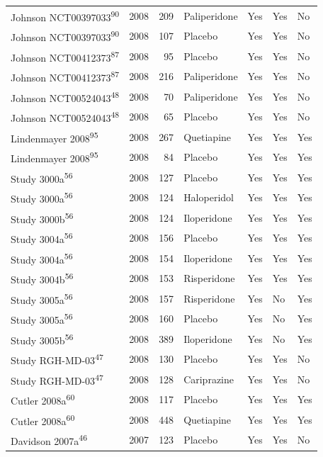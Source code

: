\documentclass[
  9pt,
  english,
  ,jou,floatsintext]{apa6}
\begin{document}
\begin{longtable}[]{@{}lrrllll@{}}
Johnson NCT00397033\textsuperscript{90} & 2008 & 209 & Paliperidone & Yes & Yes & No \\
Johnson NCT00397033\textsuperscript{90} & 2008 & 107 & Placebo & Yes & Yes & No \\
Johnson NCT00412373\textsuperscript{87} & 2008 & 95 & Placebo & Yes & Yes & No \\
Johnson NCT00412373\textsuperscript{87} & 2008 & 216 & Paliperidone & Yes & Yes & No \\
Johnson NCT00524043\textsuperscript{48} & 2008 & 70 & Paliperidone & Yes & Yes & No \\
Johnson NCT00524043\textsuperscript{48} & 2008 & 65 & Placebo & Yes & Yes & No \\
Lindenmayer 2008\textsuperscript{95} & 2008 & 267 & Quetiapine & Yes & Yes & Yes \\
Lindenmayer 2008\textsuperscript{95} & 2008 & 84 & Placebo & Yes & Yes & Yes \\
Study 3000a\textsuperscript{56} & 2008 & 127 & Placebo & Yes & Yes & Yes \\
Study 3000a\textsuperscript{56} & 2008 & 124 & Haloperidol & Yes & Yes & Yes \\
Study 3000b\textsuperscript{56} & 2008 & 124 & Iloperidone & Yes & Yes & Yes \\
Study 3004a\textsuperscript{56} & 2008 & 156 & Placebo & Yes & Yes & Yes \\
Study 3004a\textsuperscript{56} & 2008 & 154 & Iloperidone & Yes & Yes & Yes \\
Study 3004b\textsuperscript{56} & 2008 & 153 & Risperidone & Yes & Yes & Yes \\
Study 3005a\textsuperscript{56} & 2008 & 157 & Risperidone & Yes & No & Yes \\
Study 3005a\textsuperscript{56} & 2008 & 160 & Placebo & Yes & No & Yes \\
Study 3005b\textsuperscript{56} & 2008 & 389 & Iloperidone & Yes & No & Yes \\
Study RGH-MD-03\textsuperscript{47} & 2008 & 130 & Placebo & Yes & Yes & No \\
Study RGH-MD-03\textsuperscript{47} & 2008 & 128 & Cariprazine & Yes & Yes & No \\
Cutler 2008a\textsuperscript{60} & 2008 & 117 & Placebo & Yes & Yes & Yes \\
Cutler 2008a\textsuperscript{60} & 2008 & 448 & Quetiapine & Yes & Yes & Yes \\
Davidson 2007a\textsuperscript{46} & 2007 & 123 & Placebo & Yes & Yes & No \\

\end{longtable}
\end{document}
